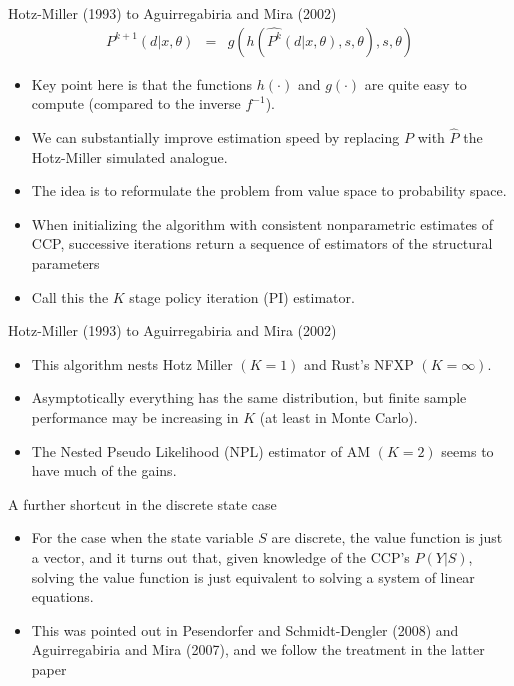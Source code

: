 \begin{frame}{Hotz-Miller (1993) to Aguirregabiria and Mira (2002)}
\begin{eqnarray*}
P^{k+1}(d | x,\theta) &=& g(h(\hat{P^{k}}(d | x, \theta),s ,\theta),s,\theta)
\end{eqnarray*}
\vspace{-0.5cm}
\begin{itemize}
\item Key point here is that the functions $h(\cdot)$ and $g(\cdot)$ are quite easy to compute (compared to the inverse $f^{-1}$).
\item We can substantially improve estimation speed by replacing $P$ with $\hat{P}$ the Hotz-Miller simulated analogue.
\item The idea is to reformulate the problem from \alert{value space} to \alert{probability space}.
\item When initializing the algorithm with consistent nonparametric estimates of CCP, successive iterations return a sequence of estimators of the structural parameters
\item Call this the $K$ stage policy iteration (PI) estimator.
\end{itemize}
\end{frame}

\begin{frame}{Hotz-Miller (1993) to Aguirregabiria and Mira (2002)}
\begin{itemize}
\item This algorithm nests Hotz Miller $(K=1)$ and Rust's NFXP $(K=\infty)$.
\item Asymptotically everything has the same distribution, but finite sample performance may be increasing in $K$ (at least in Monte Carlo).
\item The Nested Pseudo Likelihood (NPL) estimator of AM $(K=2)$ seems to have much of the gains.
\end{itemize}
\end{frame}




\begin{frame}{A further shortcut in the discrete state case}
\begin{itemize}
\item For the case when the state variable $S$ are discrete, the value function is just a vector, and it turns out that, given knowledge of the CCP's $P(Y|S)$, solving the value function is just equivalent  to solving a system of linear equations.
\item  This was pointed out in Pesendorfer and Schmidt-Dengler (2008) and Aguirregabiria and Mira (2007), and we follow the treatment in the latter paper
\end{itemize}
\end{frame}

